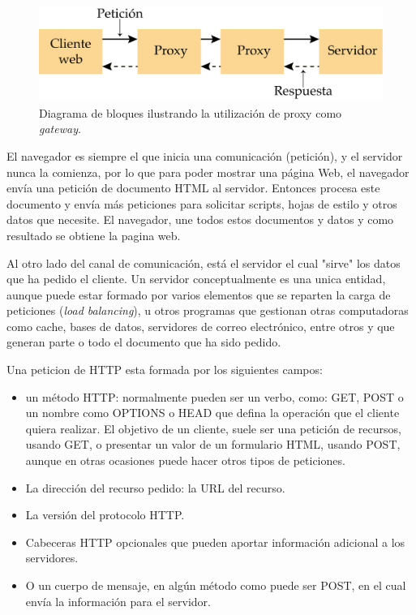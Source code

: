 \begin{figure}[htpb]
	\centering
	\includegraphics[scale=.80]{./Figures/server-proxy.png}
	\caption[Utilizacion de proxy como  \textit{gateway}.  ]{Diagrama de bloques ilustrando la utilización de proxy como  \textit{gateway}.}
	\label{fig:server-proxy}
\end{figure}


El navegador es siempre el que inicia una comunicación (petición), y el servidor nunca la comienza, por lo que para poder mostrar una página Web, el navegador envía una petición de documento HTML al servidor. Entonces procesa este documento y envía más peticiones para solicitar scripts, hojas de estilo y otros datos que necesite. El navegador, une todos estos documentos y datos y como resultado se obtiene la pagina web. 

Al otro lado del canal de comunicación, está el servidor el cual "sirve" los datos que ha pedido el cliente. Un servidor conceptualmente es una unica entidad, aunque puede estar formado por varios elementos que se reparten la carga de peticiones (\textit{load balancing}), u otros programas que gestionan otras computadoras como cache, bases de datos, servidores de correo electrónico, entre otros y que generan parte o todo el documento que ha sido pedido. 

Una peticion de HTTP esta formada por los siguientes campos:

\begin{itemize}
	\item un método HTTP: normalmente pueden ser un verbo, como: GET, POST o un nombre como OPTIONS o HEAD que defina la operación que el cliente quiera realizar. El objetivo de un cliente, suele ser una petición de recursos, usando GET, o presentar un valor de un formulario HTML, usando POST, aunque en otras ocasiones puede hacer otros tipos de peticiones. 
	
	\item La dirección del recurso pedido: la URL del recurso.
	
	\item La versión del protocolo HTTP.
	
	\item Cabeceras HTTP opcionales que pueden aportar información adicional a los servidores.
	
	\item O un cuerpo de mensaje, en algún método como puede ser POST, en el cual envía la información para el servidor.
	
\end{itemize}

